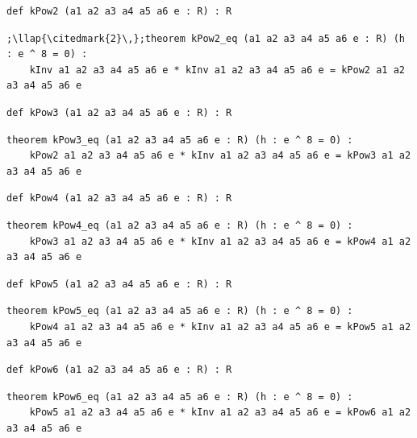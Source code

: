 \begin{lstlisting}[style=leancat]
def kPow2 (a1 a2 a3 a4 a5 a6 e : R) : R
\end{lstlisting}

\begin{lstlisting}[style=leancat]
;\llap{\citedmark{2}\,};theorem kPow2_eq (a1 a2 a3 a4 a5 a6 e : R) (h : e ^ 8 = 0) :
    kInv a1 a2 a3 a4 a5 a6 e * kInv a1 a2 a3 a4 a5 a6 e = kPow2 a1 a2 a3 a4 a5 a6 e
\end{lstlisting}

\begin{lstlisting}[style=leancat]
def kPow3 (a1 a2 a3 a4 a5 a6 e : R) : R
\end{lstlisting}

\begin{lstlisting}[style=leancat]
theorem kPow3_eq (a1 a2 a3 a4 a5 a6 e : R) (h : e ^ 8 = 0) :
    kPow2 a1 a2 a3 a4 a5 a6 e * kInv a1 a2 a3 a4 a5 a6 e = kPow3 a1 a2 a3 a4 a5 a6 e
\end{lstlisting}

\begin{lstlisting}[style=leancat]
def kPow4 (a1 a2 a3 a4 a5 a6 e : R) : R
\end{lstlisting}

\begin{lstlisting}[style=leancat]
theorem kPow4_eq (a1 a2 a3 a4 a5 a6 e : R) (h : e ^ 8 = 0) :
    kPow3 a1 a2 a3 a4 a5 a6 e * kInv a1 a2 a3 a4 a5 a6 e = kPow4 a1 a2 a3 a4 a5 a6 e
\end{lstlisting}

\begin{lstlisting}[style=leancat]
def kPow5 (a1 a2 a3 a4 a5 a6 e : R) : R
\end{lstlisting}

\begin{lstlisting}[style=leancat]
theorem kPow5_eq (a1 a2 a3 a4 a5 a6 e : R) (h : e ^ 8 = 0) :
    kPow4 a1 a2 a3 a4 a5 a6 e * kInv a1 a2 a3 a4 a5 a6 e = kPow5 a1 a2 a3 a4 a5 a6 e
\end{lstlisting}

\begin{lstlisting}[style=leancat]
def kPow6 (a1 a2 a3 a4 a5 a6 e : R) : R
\end{lstlisting}

\begin{lstlisting}[style=leancat]
theorem kPow6_eq (a1 a2 a3 a4 a5 a6 e : R) (h : e ^ 8 = 0) :
    kPow5 a1 a2 a3 a4 a5 a6 e * kInv a1 a2 a3 a4 a5 a6 e = kPow6 a1 a2 a3 a4 a5 a6 e
\end{lstlisting}

